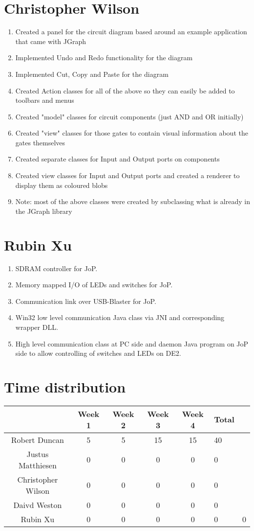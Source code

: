 \documentclass[12pt, a4paper, oneside,titlepage]{article}
\begin{document}
\section{Christopher Wilson}
\begin{enumerate}
    \item  Created a panel for the circuit diagram based around an example application that came with JGraph
    \item Implemented Undo and Redo functionality for the diagram
    \item Implemented Cut, Copy and Paste for the diagram
    \item Created Action classes for all of the above so they can easily be added to toolbars and menus
    \item Created "model" classes for circuit components (just AND and OR initially)
    \item Created "view" classes for those gates to contain visual information about the gates themselves
    \item Created separate classes for Input and Output ports on components
    \item Created view classes for Input and Output ports and created a renderer to display them as coloured blobs
    \item Note: most of the above classes were created by subclassing what is already in the JGraph library
\end{enumerate}
\section{Rubin Xu}
\begin{enumerate}
\item SDRAM controller for JoP.
\item Memory mapped I/O of LEDs and switches for JoP.
\item Communication link over USB-Blaster for JoP.
\item Win32 low level communication Java class via JNI and corresponding wrapper DLL.
\item High level communication class at PC side and daemon Java program on JoP side to allow controlling of switches and LEDs on DE2.
\end{enumerate}
\section{Time distribution}
\begin{tabular}{c | c | c | c | c}
& Week 1 & Week 2 & Week 3 & Week 4 & Total\\
\hline
Robert Duncan & 5 & 5 & 15 & 15 & 40\\
\hline
Justus Matthiesen & 0 & 0 & 0 & 0 & 0 \\
\hline
Christopher Wilson & 0 & 0 & 0 & 0 & 0\\
\hline
Daivd Weston & 0 & 0 & 0 & 0 & 0\\
\hline
Rubin Xu & 0 & 0 & 0 & 0 & 0 & 0\\
\end{tabular}
\end{document}
